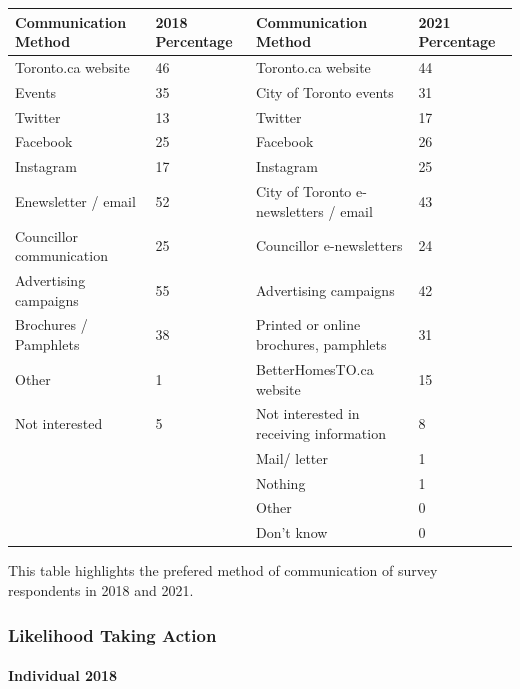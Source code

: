 \documentclass[
  letterpaper,
  DIV=11,
  numbers=noendperiod]{scrartcl}
\let\oldparagraph\paragraph
\renewcommand{\paragraph}[1]{\oldparagraph{#1}\mbox{}}
\begin{document}
\begin{table}
\centering
\begin{tabular}[t]{l|l|l|l}
\hline
Communication Method & 2018 Percentage & Communication Method & 2021 Percentage\\
\hline
Toronto.ca website & 46 & Toronto.ca website & 44\\
\hline
Events & 35 & City of Toronto events & 31\\
\hline
Twitter & 13 & Twitter & 17\\
\hline
Facebook & 25 & Facebook & 26\\
\hline
Instagram & 17 & Instagram & 25\\
\hline
Enewsletter / email & 52 & City of Toronto e-newsletters / email & 43\\
\hline
Councillor communication & 25 & Councillor e-newsletters & 24\\
\hline
Advertising campaigns & 55 & Advertising campaigns & 42\\
\hline
Brochures / Pamphlets & 38 & Printed or online brochures, pamphlets & 31\\
\hline
Other & 1 & BetterHomesTO.ca website & 15\\
\hline
Not interested & 5 & Not interested in receiving information & 8\\
\hline
 &  & Mail/ letter & 1\\
\hline
 &  & Nothing & 1\\
\hline
 &  & Other & 0\\
\hline
 &  & Don't know & 0\\
\hline
\end{tabular}
\end{table}

This table highlights the prefered method of communication of survey
respondents in 2018 and 2021.

\subsubsection{Likelihood Taking Action}\label{likelihood-taking-action}

\paragraph{Individual 2018}\label{individual-2018-4}
\end{document}
